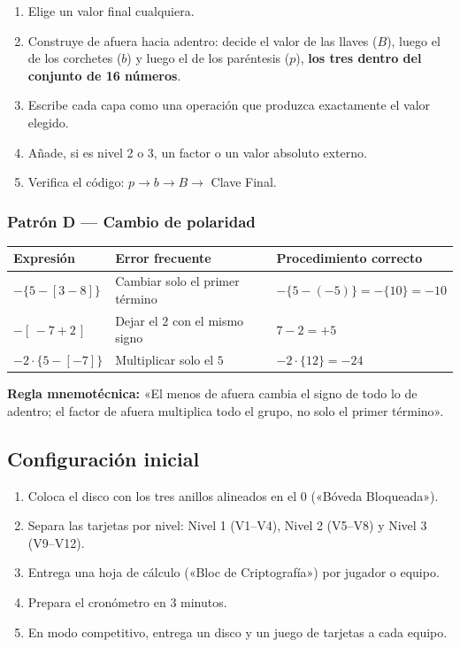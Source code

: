 \documentclass[12pt, letterpaper]{article}
\begin{document}
\begin{enumerate}[leftmargin=*]
  \item Elige un valor final cualquiera.
  \item Construye de afuera hacia adentro: decide el valor de las llaves ($B$), luego el de los corchetes ($b$) y luego el de los paréntesis ($p$), \textbf{los tres dentro del conjunto de 16 números}.
  \item Escribe cada capa como una operación que produzca exactamente el valor elegido.
  \item Añade, si es nivel 2 o 3, un factor o un valor absoluto externo.
  \item Verifica el código: $p\rightarrow b\rightarrow B\rightarrow$ Clave Final.
\end{enumerate}

\subsubsection{Patrón D — Cambio de polaridad}

\begin{center}
\small
\begin{tabular}{@{}l l l@{}}
\toprule
\textbf{Expresión} & \textbf{Error frecuente} & \textbf{Procedimiento correcto}\\
\midrule
$-\{5-[3-8]\}$ & Cambiar solo el primer término & $-\{5-(-5)\}=-\{10\}=-10$\\
$-[\,-7+2\,]$ & Dejar el $2$ con el mismo signo & $7-2=+5$\\
$-2\cdot\{5-[-7]\}$ & Multiplicar solo el $5$ & $-2\cdot\{12\}=-24$\\
\bottomrule
\end{tabular}
\end{center}

\begin{cuadroextra}
\textbf{Regla mnemotécnica:} «El menos de afuera cambia el signo de todo lo de adentro; el factor de afuera multiplica todo el grupo, no solo el primer término».
\end{cuadroextra}

\subsection{Configuración inicial}

\begin{enumerate}[leftmargin=*]
  \item Coloca el disco con los tres anillos alineados en el $0$ («Bóveda Bloqueada»).
  \item Separa las tarjetas por nivel: Nivel 1 (V1--V4), Nivel 2 (V5--V8) y Nivel 3 (V9--V12).
  \item Entrega una hoja de cálculo («Bloc de Criptografía») por jugador o equipo.
  \item Prepara el cronómetro en $3$ minutos.
  \item En modo competitivo, entrega un disco y un juego de tarjetas a cada equipo.
\end{enumerate}
\end{document}
